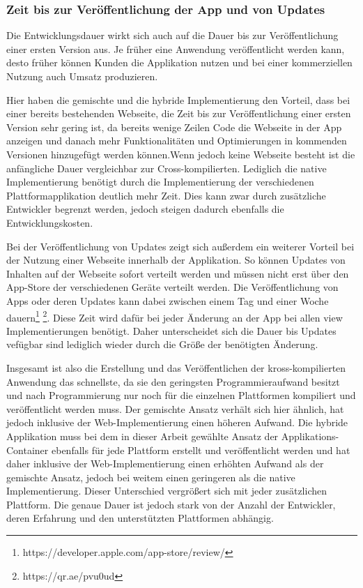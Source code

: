 \subsubsection{Zeit bis zur Veröffentlichung der App und von Updates }
Die Entwicklungsdauer wirkt sich auch auf die Dauer bis zur Veröffentlichung einer ersten Version aus.
Je früher eine Anwendung veröffentlicht werden kann, desto früher können Kunden die Applikation nutzen und bei einer kommerziellen Nutzung auch Umsatz produzieren.

Hier haben die gemischte und die hybride Implementierung den Vorteil, dass bei einer bereits bestehenden Webseite, die Zeit bis zur Veröffentlichung einer ersten Version sehr gering ist, da bereits wenige Zeilen Code die Webseite in der App anzeigen und danach mehr Funktionalitäten und Optimierungen in kommenden Versionen hinzugefügt werden können.Wenn jedoch keine Webseite besteht ist die anfängliche Dauer vergleichbar zur Cross-kompilierten. Lediglich die native Implementierung benötigt durch die Implementierung der verschiedenen Plattformapplikation deutlich mehr Zeit. Dies kann zwar durch zusätzliche Entwickler begrenzt werden, jedoch steigen dadurch ebenfalls die Entwicklungskosten.

Bei der Veröffentlichung von Updates zeigt sich außerdem ein weiterer Vorteil bei der Nutzung einer Webseite innerhalb der Applikation. So können Updates von Inhalten auf der Webseite sofort verteilt werden und müssen nicht erst über den App-Store der verschiedenen Geräte verteilt werden. Die Veröffentlichung von Apps oder deren Updates kann dabei zwischen einem Tag und einer Woche dauern\footnote{https://developer.apple.com/app-store/review/} \footnote{https://qr.ae/pvu0ud}. Diese Zeit wird dafür bei jeder Änderung an der App bei allen view Implementierungen benötigt. Daher unterscheidet sich die Dauer bis Updates vefügbar sind lediglich wieder durch die Größe der benötigten Änderung. 

Insgesamt ist also die Erstellung und das Veröffentlichen der kross-kompilierten Anwendung das schnellste, da sie den geringsten Programmieraufwand besitzt und nach Programmierung nur noch für die einzelnen Plattformen kompiliert und veröffentlicht werden muss. Der gemischte Ansatz verhält sich hier ähnlich, hat jedoch inklusive der Web-Implementierung einen höheren Aufwand. Die hybride Applikation muss bei dem in dieser Arbeit gewählte Ansatz der Applikations-Container ebenfalls für jede Plattform erstellt und veröffentlicht werden und hat daher inklusive der Web-Implementierung einen erhöhten Aufwand als der gemischte Ansatz, jedoch bei weitem einen geringeren als die native Implementierung. Dieser Unterschied vergrößert sich mit jeder zusätzlichen Plattform. Die genaue Dauer ist jedoch stark von der Anzahl der Entwickler, deren Erfahrung und den unterstützten Plattformen abhängig. 

